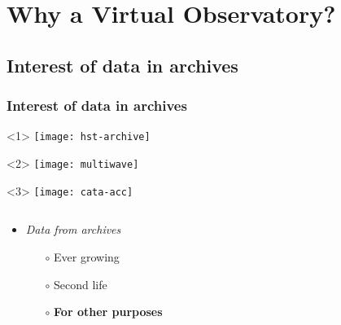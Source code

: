 \section{Why a Virtual Observatory?}


\subsection{Interest of data in archives}
\begin{frame}
  \frametitle{Interest of data in archives}

  \begin{overlayarea}{\textwidth}{.6\textheight}
    \begin{onlyenv}<1>
      \hspace{0.15\hsize}\texttt{[image: hst-archive]}%
    \end{onlyenv}

    \begin{onlyenv}<2>
      \vspace{.5em}
      \hspace{0.1\hsize}\texttt{[image: multiwave]}\\
    \end{onlyenv}

    \begin{onlyenv}<3>
      \hspace{0.25\textwidth}\texttt{[image: cata-acc]}\\
      \vspace{-2.5em}
    \end{onlyenv}

  \end{overlayarea}

  \begin{overlayarea}{\textwidth}{.3\textheight}
    \begin{columns}[T]

      \begin{column}{.35\textwidth}
        \begin{itemize}[<+->]
          \item \emph{Data from archives}
            \begin{itemize}[<.->]
              \item[$\circ$] Ever growing
              \item[$\circ$] Second life
              \item[$\circ$] \textbf{For other purposes}
            \end{itemize}
          \end{itemize}
      \end{column}



\end{columns}
\end{overlayarea}
\end{frame}

